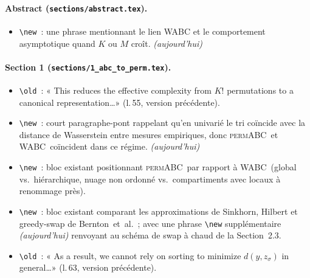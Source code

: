 \documentclass[11pt]{article}
\newcommand{\permABC}{\textsc{permABC}}
\newcommand{\WABC}{\textsc{WABC}}
\begin{document}
\paragraph{Abstract (\texttt{sections/abstract.tex}).}
\begin{itemize}[nosep]
    \item \texttt{\textbackslash new}~: une phrase mentionnant le lien WABC et le comportement
    asymptotique quand $K$ ou $M$ croît. \textit{(aujourd'hui)}
\end{itemize}

\paragraph{Section 1 (\texttt{sections/1\_abc\_to\_perm.tex}).}
\begin{itemize}[nosep]
    \item \texttt{\textbackslash old}~: « This reduces the effective complexity from $K!$
    permutations to a canonical representation\ldots » (l.\,55, version précédente).
    \item \texttt{\textbackslash new}~: court paragraphe-pont rappelant qu'en univarié le tri
    coïncide avec la distance de Wasserstein entre mesures empiriques, donc \permABC\ et
    \WABC\ coïncident dans ce régime. \textit{(aujourd'hui)}
    \item \texttt{\textbackslash new}~: bloc existant positionnant \permABC\ par rapport à
    \WABC\ (global vs.\ hiérarchique, nuage non ordonné vs.\ compartiments avec locaux à
    renommage près).
    \item \texttt{\textbackslash new}~: bloc existant comparant les approximations de Sinkhorn,
    Hilbert et greedy-swap de Bernton~et~al.~; avec une phrase \texttt{\textbackslash new}
    supplémentaire \textit{(aujourd'hui)} renvoyant au schéma de swap à chaud de la Section~2.3.
    \item \texttt{\textbackslash old}~: « As a result, we cannot rely on sorting to minimize
    $d(y,z_\sigma)$ in general\ldots » (l.\,63, version précédente).
\end{itemize}
\end{document}
